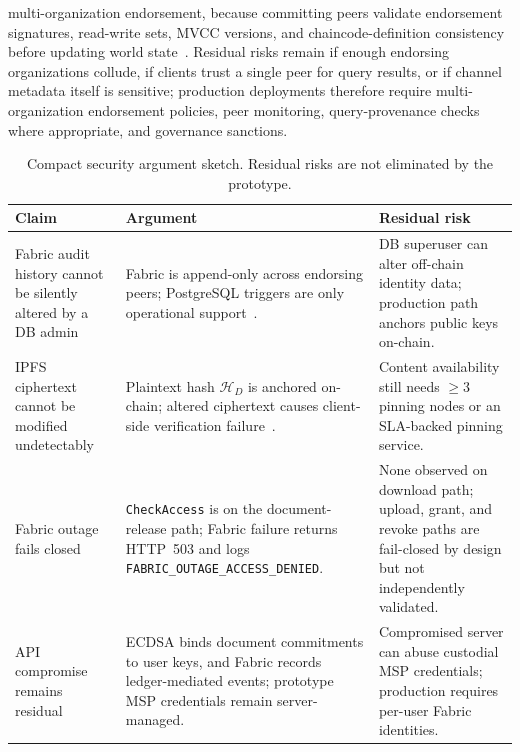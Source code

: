 \documentclass{ieeeaccess}
\begin{document}
\begin{table}[!t]
\begin{minipage}{\textwidth}
multi-organization endorsement, because committing peers validate endorsement
signatures, read-write sets, MVCC versions, and chaincode-definition
consistency before updating world state~\cite{androulaki2018hyperledger,
hyperledgerFabricOrderingService_v24}. Residual risks remain if enough
endorsing organizations collude, if clients trust a single peer for query
results, or if channel metadata itself is sensitive; production deployments
therefore require multi-organization endorsement policies, peer monitoring,
query-provenance checks where appropriate, and governance sanctions.
\end{minipage}
\end{table}

\begin{table}[!t]
\centering
\caption{Compact security argument sketch. Residual risks are not eliminated by the prototype.}
\label{tab:security_claims}
\renewcommand{\arraystretch}{1.08}
\setlength{\tabcolsep}{1.8pt}
\tiny
\begin{tabularx}{\columnwidth}{|>{\RaggedRight\arraybackslash}p{1.25cm}|>{\RaggedRight\arraybackslash}p{2.55cm}|>{\RaggedRight\arraybackslash}X|}
\hline
\textbf{Claim} & \textbf{Argument} & \textbf{Residual risk} \\
\hline
Fabric audit history cannot be silently altered by a DB admin &
Fabric is append-only across endorsing peers; PostgreSQL triggers are only operational support~\cite{androulaki2018hyperledger}. &
DB superuser can alter off-chain identity data; production path anchors public keys on-chain. \\
\hline
IPFS ciphertext cannot be modified undetectably &
Plaintext hash $\mathcal{H}_D$ is anchored on-chain; altered ciphertext causes client-side verification failure~\cite{benet2014ipfs}. &
Content availability still needs $\geq$3 pinning nodes or an SLA-backed pinning service. \\
\hline
Fabric outage fails closed &
\texttt{CheckAccess} is on the document-release path; Fabric failure returns HTTP~503 and logs \texttt{FABRIC\_\allowbreak OUTAGE\_\allowbreak ACCESS\_\allowbreak DENIED}. &
None observed on download path; upload, grant, and revoke paths are fail-closed by design but not independently validated. \\
\hline
API compromise remains residual &
ECDSA binds document commitments to user keys, and Fabric records ledger-mediated events; prototype MSP credentials remain server-managed. &
Compromised server can abuse custodial MSP credentials; production requires per-user Fabric identities. \\

\end{tabularx}
\end{table}
\end{document}
